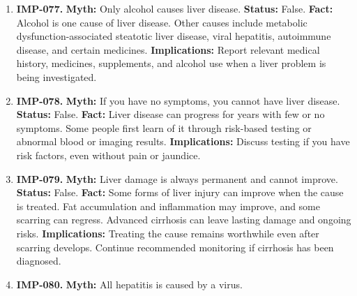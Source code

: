 \documentclass[11pt,oneside]{book}
\begin{document}
\begin{enumerate}[leftmargin=0pt,labelwidth=0pt,labelsep=0pt,itemindent=0pt]
\textbf{Status:} False.\newline
\textbf{Fact:} Randomized trials do not show that adding breakfast is a reliable weight-loss strategy for everyone. The studies were generally short, so they also cannot settle every question about long-term meal patterns. \cite{ref423}\newline
\textbf{Implications:} Choose a meal pattern that suits your appetite, schedule, and medical needs. Overall intake matters more than treating breakfast as compulsory.
\item[] \textbf{IMP-077.} \textbf{Myth:} Only alcohol causes liver disease.\newline
\textbf{Status:} False.\newline
\textbf{Fact:} Alcohol is one cause of liver disease. Other causes include metabolic dysfunction-associated steatotic liver disease, viral hepatitis, autoimmune disease, and certain medicines. \cite{ref424}\newline
\textbf{Implications:} Report relevant medical history, medicines, supplements, and alcohol use when a liver problem is being investigated.
\item[] \textbf{IMP-078.} \textbf{Myth:} If you have no symptoms, you cannot have liver disease.\newline
\textbf{Status:} False.\newline
\textbf{Fact:} Liver disease can progress for years with few or no symptoms. Some people first learn of it through risk-based testing or abnormal blood or imaging results. \cite{ref424}\newline
\textbf{Implications:} Discuss testing if you have risk factors, even without pain or jaundice.
\item[] \textbf{IMP-079.} \textbf{Myth:} Liver damage is always permanent and cannot improve.\newline
\textbf{Status:} False.\newline
\textbf{Fact:} Some forms of liver injury can improve when the cause is treated. Fat accumulation and inflammation may improve, and some scarring can regress. Advanced cirrhosis can leave lasting damage and ongoing risks. \cite{ref424,ref21}\newline
\textbf{Implications:} Treating the cause remains worthwhile even after scarring develops. Continue recommended monitoring if cirrhosis has been diagnosed.
\item[] \textbf{IMP-080.} \textbf{Myth:} All hepatitis is caused by a virus.\newline

\end{enumerate}
\end{document}

